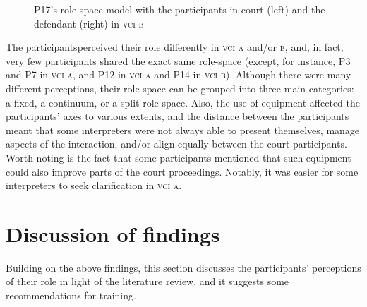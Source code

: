 \documentclass[output=paper]{langsci/langscibook}
\begin{document}
\begin{figure}
   
\caption{\label{fig:devaux:9}P17's role-space model with the participants in court (left) and the defendant (right) in \textsc{vci b}}
\end{figure}

The participants\largerpage perceived their role differently in \textsc{vci a} and/or \textsc{b}, and, in fact, very few participants shared the exact same role-space (except, for instance, P3 and P7 in \textsc{vci a}, and P12 in \textsc{vci a} and P14 in \textsc{vci b}). Although there were many different perceptions, their role-space can be grouped into three main categories: a fixed, a continuum, or a split role-space. Also, the use of equipment affected the participants’ axes to various extents, and the distance between the participants meant that some interpreters were not always able to present themselves, manage aspects of the interaction, and/or align equally between the court participants. Worth noting is the fact that some participants mentioned that such equipment could also improve parts of the court proceedings. Notably, it was easier for some interpreters to seek clarification in \textsc{vci a}. 

\section{Discussion of findings}
\label{sec:devaux:6}
Building on the above findings, this section discusses the participants’ perceptions of their role in light of the literature review, and it suggests some recommendations for training.
\end{document}
